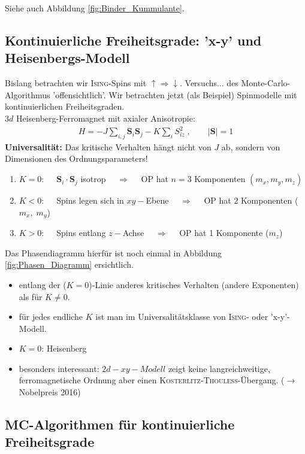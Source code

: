 \documentclass[12pt]{article}
\begin{document}
Siehe auch Abbildung \ref{fig:Binder_Kummulante}.
 \subsection{Kontinuierliche Freiheitsgrade: 'x-y' und Heisenbergs-Modell} \label{Kapitel2.9}
 Bislang betrachten wir \textsc{Ising}-Spins mit $ \uparrow \Rightarrow \downarrow$. Versuchs... %
 des Monte-Carlo-Algorithmus 'offensichtlich'. Wir betrachten jetzt (als Beispiel) Spinmodelle mit kontinuierlichen Freiheitsgraden.\\ 
 $3d$ Heisenberg-Ferromagnet mit axialer Anisotropie: 
 \begin{align}
 H= - J \sum_{i,j} \mathbf{S}_i \mathbf{S}_j - K \sum_i S_{iz}^2 \; , \quad \quad  \vert \mathbf{S} \vert
 =1
 \end{align}
 \textbf{Universalität:} Das kritische Verhalten hängt nicht von $J$ ab, sondern von Dimensionen des Ordnungsparameters!
 \begin{enumerate}
 \item $K= 0:  \quad$ $\mathbf{S}_i \cdot \mathbf{S}_j$ isotrop $ \quad \Rightarrow  \quad$ OP hat $n=3$ Komponenten $(m_x, m_y, m_z)$
 \item $K<0:  \quad$ Spins legen sich in $xy-$Ebene $ \quad \Rightarrow  \quad$ OP hat $2$ Komponenten ($m_x, \; m_y$)
 \item $K>0 : \quad$ Spins entlang $z-$Achse $ \quad \Rightarrow  \quad$ OP hat 1 Komponente ($m_z$)
 \end{enumerate}
 Das Phasendiagramm hierfür ist noch einmal in Abbildung \ref{fig:Phasen_Diagramm} ersichtlich.
 \begin{itemize}
 \item entlang der ($K=0$)-Linie anderes kritisches Verhalten (andere Exponenten) als für $K\neq 0$.
 \item für jedes endliche $K$ ist man im Universalitätsklasse von \textsc{Ising}- oder 'x-y'-Modell. 
 \item $K=0$: Heisenberg
 
 \item besonders interessant: $2d-xy-Modell$ zeigt keine langreichweitige, ferromagnetische Ordnung aber einen \textsc{Kosterlitz-Thouless}-Übergang. ($\to$ Nobelpreis 2016) 
\end{itemize}
\subsection{MC-Algorithmen für kontinuierliche Freiheitsgrade}
\end{document}
